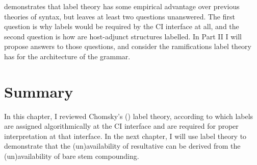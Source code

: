 \documentclass[MilwayThesis]{subfiles}
\begin{document}
\textcite{chomsky2015problems} demonstrates that label theory has some empirical advantage over previous theories of syntax, but leaves at least two questions unanswered.
The first question is why labels would be required by the CI interface at all, and the second question is how are host-adjunct structures labelled.
In Part II I will propose answers to those questions, and consider the ramifications label theory has for the architecture of the grammar.

\section{Summary}
In this chapter, I reviewed Chomsky's (\citeyear{chomsky2013problems,chomsky2015problems}) label theory, according to which labels are assigned algorithmically at the CI interface and are required for proper interpretation at that interface.
In the next chapter, I will use label theory to demonstrate that the (un)availability of resultative can be derived from the (un)availability of bare stem compounding.
\end{document}

